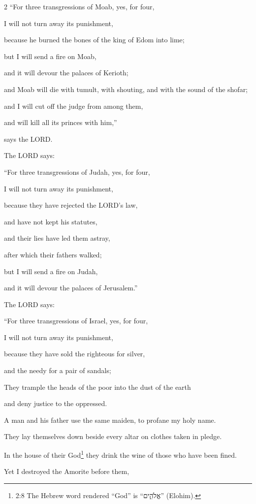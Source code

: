 \begin{multicols}{2}
	“For three transgressions of Moab, yes, for four,
	
	I will not turn away its punishment,
	
	because he burned the bones of the king of Edom into lime;
	
	\myverse{}but I will send a fire on Moab,
	
	and it will devour the palaces of Kerioth;
	
	and Moab will die with tumult, with shouting, and with the sound of the shofar;
	
	\myverse{}and I will cut off the judge from among them,
	
	and will kill all its princes with him,”
	
	says the LORD.
	
	\myverse{}The LORD says:
	
	“For three transgressions of Judah, yes, for four,
	
	I will not turn away its punishment,
	
	because they have rejected the LORD’s law,
	
	and have not kept his statutes,
	
	and their lies have led them astray,
	
	after which their fathers walked;
	
	\myverse{}but I will send a fire on Judah,
	
	and it will devour the palaces of Jerusalem.”
	
	\myverse{}The LORD says:
	
	“For three transgressions of Israel, yes, for four,
	
	I will not turn away its punishment,
	
	because they have sold the righteous for silver,
	
	and the needy for a pair of sandals;
	
	\myverse{}They trample the heads of the poor into the dust of
	the earth
	
	and deny justice to the oppressed.
	
	A man and his father use the same maiden, to profane my holy name.
	
	\myverse{}They lay themselves down beside every altar on clothes
	taken in pledge.
	
	In the house of their God\footnote{2:8 The Hebrew word rendered “God” is “אֱלֹהִ֑ים” (Elohim).} they drink the wine
	of those who have been fined.
	
	\myverse{}Yet I destroyed the Amorite before them,
	

\end{multicols}
